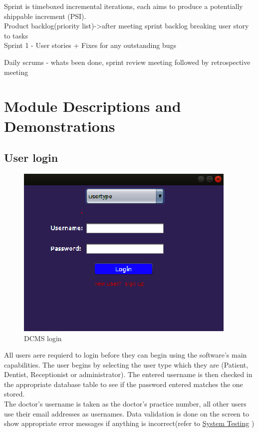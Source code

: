 \documentclass[11 pt]{article}
\begin{document}
Sprint is timeboxed incremental iterations, each aims to produce a potentially shippable increment (PSI).\\
Product backlog(priority list)->after meeting sprint backlog breaking user story to tasks \\
Sprint 1 - User stories + Fixes for any outstanding bugs

Daily scrums - whats been done, sprint review meeting
followed by retrospective meeting
\clearpage
\section{Module Descriptions and Demonstrations} 
\subsection{User login}
\begin{figure}[h]
    \centering 
    \includegraphics[width=0.7\linewidth]{login.png}
    \caption{DCMS login}
    \label{fig:login}
    \end{figure}
All users aere requierd to login before they can begin using the software's main capabilities. The user begins by selecting the user type which they are (Patient, Dentist, Receptionist or administrator). The entered username is then checked in the appropriate database table to see if the password entered matches the one stored. \\
The doctor's username is taken as the doctor's practice number, all other users use their email addresses as usernames.
Data validation is done on the screen to show appropriate error messages if anything is incorrect(refer to 
\hyperref[sec:system_testing]{System Testing} )
\end{document}

